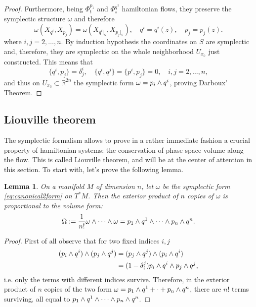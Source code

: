 \documentclass[english,fontsize=11pt,paper=a5,oneside]{scrbook}
\newcommand{\R}{\mathbb{R}}
\let\d\relax
\DeclareMathOperator{\d}{d}
\newtheorem{lemma}[theorem]{Lemma}
\theoremstyle{definition}
\begin{document}
\begin{proof}
    Furthermore, being $\Phi_t^{p_1}$ and $\Phi_s^{q^1}$ hamiltonian flows, they preserve the symplectic structure $\omega$ and therefore
    \begin{equation}
        \omega(X_{q^i}, X_{p_j}) = \omega(X_{q^i|_S}, X_{p_j|_S}),
        \quad q^i = q^i(z),
        \quad p_j = p_j(z).
    \end{equation}
    where $i,j=2,\ldots,n$.
    By induction hypothesis the coordinates on $S$ are symplectic and, therefore, they are symplectic on the whole neighborhood $U_{x_0}$ just constructed.
    This means that
    \begin{equation}
        \big\{q^i, p_j\big\} = \delta_j^i, \quad
        \big\{q^i, q^j\big\} = \big\{p^i, p_j\big\} = 0, \quad
        i,j=2,\ldots,n,
    \end{equation}
    and thus on $U_{x_0}\subset\R^{2n}$ the symplectic form $\omega=\d p_i \wedge \d q^i$, proving Darboux' Theorem.
\end{proof}

\subsection{Liouville theorem}

The symplectic formalism allows to prove in a rather immediate fashion a crucial property of hamiltonian systems: the conservation of phase space volume along the flow.
This is called Liouville theorem, and will be at the center of attention in this section.
To start with, let's prove the following lemma.

\begin{lemma}
    On a manifold $M$ of dimension $n$, let $\omega$ be the symplectic form \eqref{eq:canonical2form} on $T^* M$. Then the exterior product of $n$ copies of $\omega$ is proportional to the volume form:
    \begin{equation}
        \Omega := \frac1{n!} \omega \wedge \cdots \wedge \omega = \d p_1 \wedge \d q^1 \wedge \cdots \wedge \d p_n \wedge \d q^n.
    \end{equation}
\end{lemma}
\begin{proof}
    First of all observe that for two fixed indices $i,j$
    \begin{align}
        (\d p_i \wedge \d q^i)\wedge (\d p_j \wedge \d q^j) &= 
        (\d p_j \wedge \d q^j)\wedge (\d p_i \wedge \d q^i) \\
        &=
        (1-\delta_i^j) \d p_i \wedge \d q^i \wedge \d p_j \wedge \d q^j,
    \end{align}
    i.e. only the terms with different indices survive.
    Therefore, in the exterior product of $n$ copies of the two form $\omega = \d p_1 \wedge \d q^1 + \cdot + \d p_n \wedge \d q^n$, there are $n!$ terms surviving, all equal to $\d p_1 \wedge \d q^1 \wedge \cdots \wedge \d p_n \wedge \d q^n$.
\end{proof}
\end{document}
